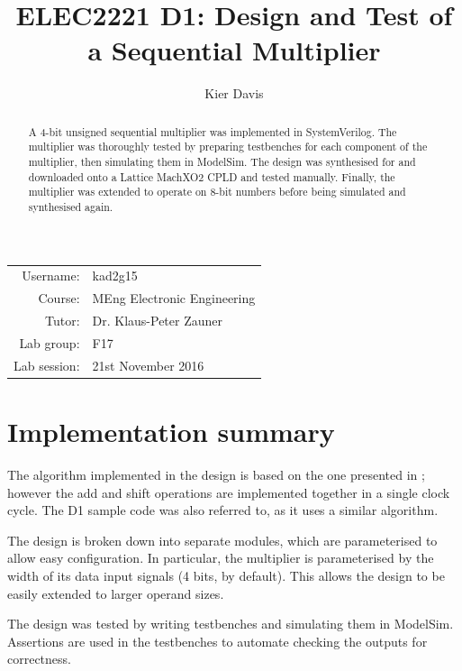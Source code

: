 \documentclass[a4paper]{article}
\title{ELEC2221 D1: Design and Test of a Sequential Multiplier}
\author{Kier Davis}
\begin{document}
\maketitle

\begin{table}[h]
  \centering
  \begin{tabular}{rl}
    Username: & kad2g15 \\
    Course: & MEng Electronic Engineering \\
    Tutor: & Dr. Klaus-Peter Zauner \\
    Lab group: & F17 \\
    Lab session: & 21st November 2016 \\
  \end{tabular}
\end{table}


\begin{abstract}
  A 4-bit unsigned sequential multiplier was implemented in SystemVerilog. The multiplier was thoroughly tested by preparing testbenches for each component of the multiplier, then simulating them in ModelSim. The design was synthesised for and downloaded onto a Lattice MachXO2 CPLD and tested manually. Finally, the multiplier was extended to operate on 8-bit numbers before being simulated and synthesised again.
\end{abstract}

\section{Implementation summary}
\label{sec:intro}

The algorithm implemented in the design is based on the one presented in \cite{gunton10}; however the add and shift operations are implemented together in a single clock cycle. The D1 sample code \cite{samplecode} was also referred to, as it uses a similar algorithm.

The design is broken down into separate modules, which are parameterised to allow easy configuration. In particular, the multiplier is parameterised by the width of its data input signals (4 bits, by default). This allows the design to be easily extended to larger operand sizes.

The design was tested by writing testbenches and simulating them in ModelSim. Assertions are used in the testbenches to automate checking the outputs for correctness.
\end{document}

